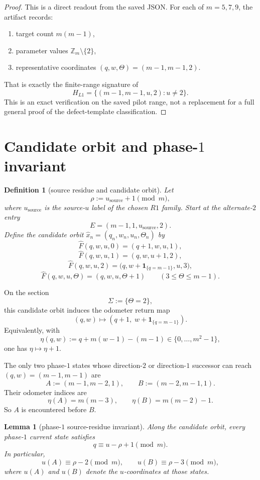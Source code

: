 \documentclass[11pt]{article}
\newtheorem{definition}[theorem]{Definition}
\newtheorem{lemma}[theorem]{Lemma}
\newcommand{\Z}{\mathbb Z}
\newcommand{\one}[1]{\mathbf 1_{\{#1\}}}
\begin{document}
\begin{proof}
This is a direct readout from the saved JSON. For each of $m=5,7,9$, the
artifact records:
\begin{enumerate}[label=\textup{(\arabic*)},leftmargin=2.5em]
\item target count $m(m-1)$,
\item parameter values $\Z_m\setminus\{2\}$,
\item representative coordinates $(q,w,\Theta)=(m-1,m-1,2)$.
\end{enumerate}
That is exactly the finite-range signature of
\[
H_{L1}=\{(m-1,m-1,u,2):u\neq 2\}.
\]
This is an exact verification on the saved pilot range, not a replacement for a
full general proof of the defect-template classification.
\end{proof}

\section{Candidate orbit and phase-$1$ invariant}

\begin{definition}[source residue and candidate orbit]
Let
\[
\rho:=u_{\mathrm{source}}+1 \pmod m,
\]
where $u_{\mathrm{source}}$ is the source-$u$ label of the chosen $R1$ family.
Start at the alternate-$2$ entry
\[
E=(m-1,1,u_{\mathrm{source}},2).
\]
Define the candidate orbit $\widehat x_n=(q_n,w_n,u_n,\Theta_n)$ by
\[
\widehat F(q,w,u,0)=(q+1,w,u,1),
\]
\[
\widehat F(q,w,u,1)=(q,w,u+1,2),
\]
\[
\widehat F(q,w,u,2)=\bigl(q,w+\one{q=m-1},u,3\bigr),
\]
\[
\widehat F(q,w,u,\Theta)=(q,w,u,\Theta+1)
\qquad (3\le \Theta\le m-1).
\]
\end{definition}

On the section
\[
\Sigma:=\{\Theta=2\},
\]
this candidate orbit induces the odometer return map
\[
(q,w)\mapsto(q+1,\;w+\one{q=m-1}).
\]
Equivalently, with
\[
\eta(q,w):=q+m(w-1)-(m-1)\in\{0,\dots,m^2-1\},
\]
one has $\eta\mapsto \eta+1$.

The only two phase-$1$ states whose direction-$2$ or direction-$1$ successor can
reach $(q,w)=(m-1,m-1)$ are
\[
A:=(m-1,m-2,1),
\qquad
B:=(m-2,m-1,1).
\]
Their odometer indices are
\[
\eta(A)=m(m-3),
\qquad
\eta(B)=m(m-2)-1.
\]
So $A$ is encountered before $B$.

\begin{lemma}[phase-$1$ source-residue invariant]\label{lem:phase1-rho}
Along the candidate orbit, every phase-$1$ current state satisfies
\[
q\equiv u-\rho+1 \pmod m.
\]
In particular,
\[
u(A)\equiv \rho-2 \pmod m,
\qquad
u(B)\equiv \rho-3 \pmod m,
\]
where $u(A)$ and $u(B)$ denote the $u$-coordinates at those states.
\end{lemma}
\end{document}
